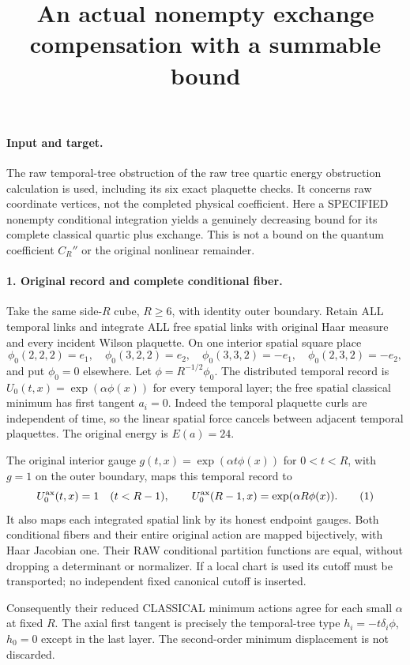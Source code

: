 \documentclass[11pt]{article}
\title{An actual nonempty exchange compensation with a summable bound}\author{}\date{}
\begin{document}
\maketitle
\paragraph{Input and target.}
The raw temporal-tree obstruction of the raw tree quartic energy obstruction calculation is used,
including its six exact plaquette checks. It concerns raw coordinate
vertices, not the completed physical coefficient. Here a SPECIFIED
nonempty conditional integration yields a genuinely decreasing bound
for its complete classical quartic plus exchange. This is not a bound
on the quantum coefficient $C_R''$ or the original nonlinear remainder.

\paragraph{1. Original record and complete conditional fiber.}
Take the same side-$R$ cube, $R\ge6$, with identity outer boundary.
Retain ALL temporal links and integrate ALL free spatial links with
original Haar measure and every incident Wilson plaquette. On one
interior spatial square place
\[
 \phi_0(2,2,2)=e_1,\quad \phi_0(3,2,2)=e_2,\quad
 \phi_0(3,3,2)=-e_1,\quad \phi_0(2,3,2)=-e_2,
\]
and put $\phi_0=0$ elsewhere. Let $\phi=R^{-1/2}\phi_0$.
The distributed temporal record is
$U_0(t,x)=\exp(\alpha\phi(x))$ for every temporal layer; the free
spatial classical minimum has first tangent $a_i=0$.
Indeed the temporal plaquette curls are independent of time, so the
linear spatial force cancels between adjacent temporal plaquettes.
The original energy is $E(a)=24$.

The original interior gauge
$g(t,x)=\exp(\alpha t\phi(x))$ for $0<t<R$, with $g=1$ on the
outer boundary, maps this temporal record to
\[
 U_0^{\rm ax}(t,x)=1\quad(t<R-1),\qquad
 U_0^{\rm ax}(R-1,x)=\exp(\alpha R\phi(x)).                    \tag{1}
\]
It also maps each integrated spatial link by its honest endpoint
gauges. Both conditional fibers and their entire original action
are mapped bijectively, with Haar Jacobian one. Their RAW conditional
partition functions are equal, without dropping a determinant or
normalizer. If a local chart is used its cutoff must be transported;
no independent fixed canonical cutoff is inserted.

Consequently their reduced CLASSICAL minimum actions agree for each
small $\alpha$ at fixed $R$. The axial first tangent is precisely the
temporal-tree type $h_i=-t\delta_i\phi$, $h_0=0$ except in the last
layer. The second-order minimum displacement is not discarded.
\end{document}
